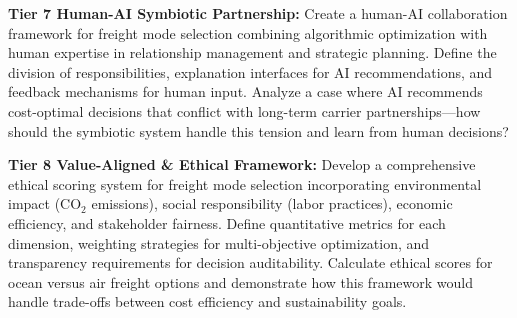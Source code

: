 \documentclass{article}
\begin{document}
\textbf{Tier 7 Human-AI Symbiotic Partnership:}
Create a human-AI collaboration framework for freight mode selection combining algorithmic optimization with human expertise in relationship management and strategic planning. Define the division of responsibilities, explanation interfaces for AI recommendations, and feedback mechanisms for human input. Analyze a case where AI recommends cost-optimal decisions that conflict with long-term carrier partnerships---how should the symbiotic system handle this tension and learn from human decisions?

\textbf{Tier 8 Value-Aligned \& Ethical Framework:}
Develop a comprehensive ethical scoring system for freight mode selection incorporating environmental impact (CO$_2$ emissions), social responsibility (labor practices), economic efficiency, and stakeholder fairness. Define quantitative metrics for each dimension, weighting strategies for multi-objective optimization, and transparency requirements for decision auditability. Calculate ethical scores for ocean versus air freight options and demonstrate how this framework would handle trade-offs between cost efficiency and sustainability goals.
\end{document}
